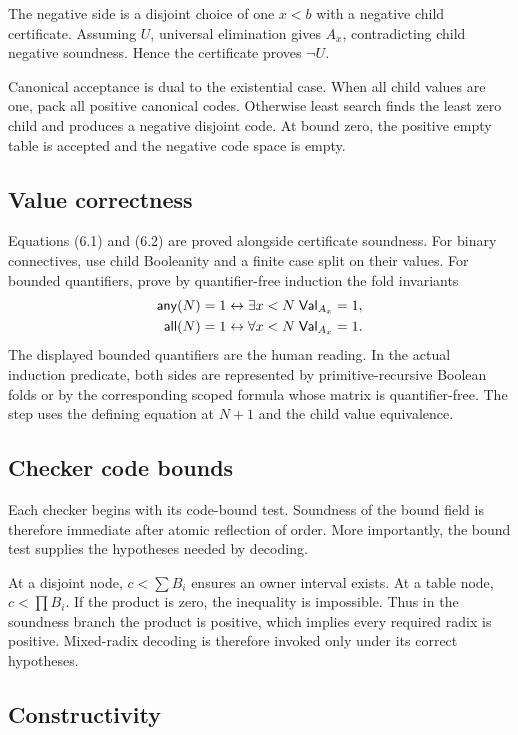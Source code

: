The negative side is a disjoint choice of one \(x<b\) with a negative child
certificate.  Assuming \(U\), universal elimination gives \(A_x\), contradicting
child negative soundness.  Hence the certificate proves \(\neg U\).

Canonical acceptance is dual to the existential case.  When all child values
are one, pack all positive canonical codes.  Otherwise least search finds the
least zero child and produces a negative disjoint code.  At bound zero, the
positive empty table is accepted and the negative code space is empty.

\subsection{Value correctness}

Equations (6.1) and (6.2) are proved alongside certificate soundness.  For
binary connectives, use child Booleanity and a finite case split on their
values.  For bounded quantifiers, prove by quantifier-free induction the fold
invariants
\begin{align*}
 \mathsf{any}(N)=1
 &\leftrightarrow \exists x<N\;\mathsf{Val}_{A_x}=1,\\
 \mathsf{all}(N)=1
 &\leftrightarrow \forall x<N\;\mathsf{Val}_{A_x}=1.
\end{align*}
The displayed bounded quantifiers are the human reading.  In the actual
induction predicate, both sides are represented by primitive-recursive Boolean
folds or by the corresponding scoped formula whose matrix is quantifier-free.
The step uses the defining equation at \(N+1\) and the child value equivalence.

\subsection{Checker code bounds}

Each checker begins with its code-bound test.  Soundness of the bound field is
therefore immediate after atomic reflection of order.  More importantly, the
bound test supplies the hypotheses needed by decoding.

At a disjoint node, \(c<\sum B_i\) ensures an owner interval exists.  At a table
node, \(c<\prod B_i\).  If the product is zero, the inequality is impossible.
Thus in the soundness branch the product is positive, which implies every
required radix is positive.  Mixed-radix decoding is therefore invoked only
under its correct hypotheses.

\subsection{Constructivity}


